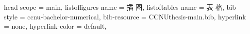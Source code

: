 {{      %
    head-scope = main,
    listoffigures-name = {插 \quad 图},
    listoftables-name  = {表 \quad 格},
    bib-style = ccnu-bachelor-numerical,
    bib-resource = {CCNUthesis-main.bib},
    hyperlink = none,
    hyperlink-color = default,
  }
}




